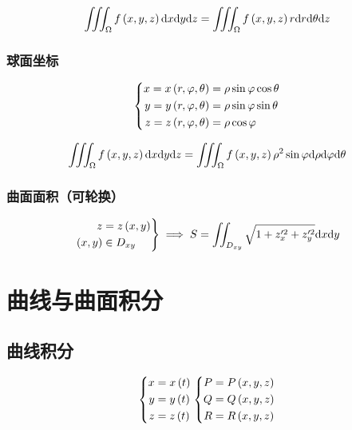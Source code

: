 \documentclass{article}
\begin{document}
\[
    \iiint_\Omega f\left(x,y,z\right)\mathrm d x\mathrm d y\mathrm d z=
    \iiint_\Omega f\left(x,y,z\right)r\mathrm d r\mathrm d\theta\mathrm d z\]

\subsubsection{球面坐标}

\[\left\{\begin{aligned}
        x=x\left(r,\varphi,\theta\right) & =\rho\sin\varphi\cos\theta \\
        y=y\left(r,\varphi,\theta\right) & =\rho\sin\varphi\sin\theta \\
        z=z\left(r,\varphi,\theta\right) & =\rho\cos\varphi           \\
    \end{aligned}\right.\]

\[
    \iiint_\Omega f\left(x,y,z\right)\mathrm d x\mathrm d y\mathrm d z=
    \iiint_\Omega f\left(x,y,z\right)\rho^2\sin\varphi\mathrm d\rho\mathrm d\varphi\mathrm d\theta\]

\subsubsection{曲面面积（可轮换）}

\[\left.\begin{aligned}
        z          & =z\left(x,y\right) \\
        \left(x,y\right) & \in D_{xy}
    \end{aligned}\right\}\implies
    S=\iint_{D_{xy}}\sqrt{1+z^{\prime2}_x+z^{\prime2}_y}\mathrm d x\mathrm d y\]

\section{曲线与曲面积分}

\subsection{曲线积分}

\begin{definition}[]
    \[\left\{\begin{aligned}
            x & =x\left(t\right) \\
            y & =y\left(t\right) \\
            z & =z\left(t\right)
        \end{aligned}\right.
        \left\{\begin{aligned}
            P & =P\left(x,y,z\right) \\
            Q & =Q\left(x,y,z\right) \\
            R & =R\left(x,y,z\right)
        \end{aligned}\right.\]
\end{definition}
\end{document}
